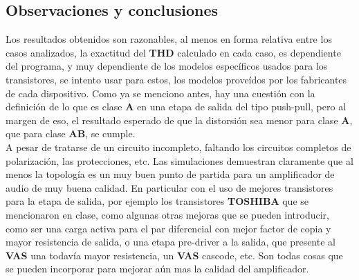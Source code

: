 
\subsection{Observaciones y conclusiones}

Los resultados obtenidos son razonables, al menos en forma relativa entre los casos analizados, la exactitud del \textbf{THD} calculado en cada caso, es dependiente del programa, y muy dependiente de los modelos específicos usados para los transistores, se intento usar para estos, los modelos proveídos por los fabricantes de cada dispositivo. Como ya se menciono antes, hay una cuestión con la definición de lo que es clase \textbf{A} en una etapa de salida del tipo push-pull, pero al margen de eso, el resultado esperado de que la distorsión sea menor para clase \textbf{A}, que para clase \textbf{AB}, se cumple. \\
A pesar de tratarse de un circuito incompleto, faltando los circuitos completos de polarización, las protecciones, etc. Las simulaciones demuestran claramente que al menos la topología es un muy buen punto de partida para un amplificador de audio de muy buena calidad. En particular con el uso de mejores transistores para la etapa de salida, por ejemplo los transistores \textbf{TOSHIBA} que se mencionaron en clase, como algunas otras mejoras que se pueden introducir, como ser una carga activa para el par diferencial con mejor factor de copia y mayor resistencia de salida, o una etapa pre-driver a la salida, que presente al \textbf{VAS} una todavía mayor resistencia, un \textbf{VAS} cascode, etc. Son todas cosas que se pueden incorporar para mejorar aún mas la calidad del amplificador.
